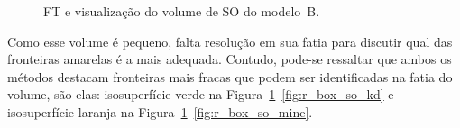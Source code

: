 \begin{figure}[h]
	\centering
	\caption{FT e visualização do volume de SO do modelo~B.}
	\label{fig:r_box_so}
\end{figure}
	
	Como esse volume é pequeno, falta resolução em sua fatia para discutir qual das fronteiras amarelas é a mais adequada. Contudo, pode-se ressaltar que ambos os métodos destacam fronteiras mais fracas que podem ser identificadas na fatia do volume, são elas: isosuperfície verde na Figura~\ref{fig:r_box_so}~\ref{fig:r_box_so_kd} e isosuperfície laranja na Figura~\ref{fig:r_box_so}~\ref{fig:r_box_so_mine}.

